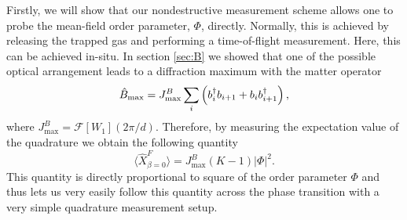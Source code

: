 Firstly, we will show that our nondestructive measurement scheme
allows one to probe the mean-field order parameter, $\Phi$,
directly. Normally, this is achieved by releasing the trapped gas and
performing a time-of-flight measurement. Here, this can be achieved
in-situ. In section \ref{sec:B} we showed that one of the possible
optical arrangement leads to a diffraction maximum with the matter
operator
\begin{equation}
  \label{eq:Bmax}
  \hat{B}_\mathrm{max} = J^B_\mathrm{max} \sum_i \left( b^\dagger_i b_{i+1}
    + b_i b^\dagger_{i+1} \right),
\end{equation}
where $J^B_\mathrm{max} = \mathcal{F}[W_1](2\pi/d)$. Therefore, by measuring the
expectation value of the quadrature we obtain the following quantity
\begin{equation}
  \langle \hat{X}^F_{\beta=0} \rangle = J^B_\mathrm{max} (K-1) | \Phi |^2 .
\end{equation}
This quantity is directly proportional to square of the order
parameter $\Phi$ and thus lets us very easily follow this quantity
across the phase transition with a very simple quadrature measurement
setup. 

